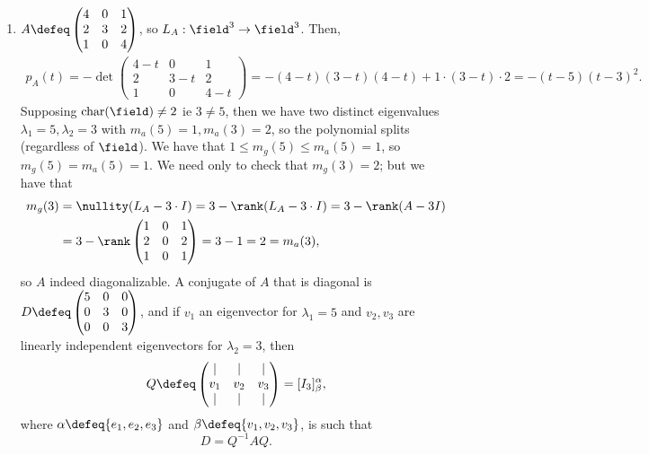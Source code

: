 \begin{example}
    \begin{enumerate}
        \item $A \defeq \begin{pmatrix}
            4 & 0 & 1\\
            2 & 3& 2\\
            1 & 0 & 4   
        \end{pmatrix}$, so $L_A : \field^3 \to \field^3$. Then, \begin{align*}
            p_A(t) = - \det\begin{pmatrix}
                4 - t & 0 & 1\\
                2 & 3 - t & 2\\
                1 & 0 & 4- t
            \end{pmatrix} = -(4-t)(3-t)(4-t) + 1 \cdot (3- t) \cdot 2 = - (t-5)(t-3)^2.
        \end{align*}
        Supposing $\text{char}(\field)\neq 2$ ie $3 \neq 5$, then we have two distinct eigenvalues $\lambda_1 = 5, \lambda_2 = 3$ with $m_a(5) = 1, m_a(3) = 2$, so the polynomial splits (regardless of $\field$). We have that $1 \leq m_g(5) \leq m_a(5) = 1$, so $m_g(5) = m_a(5) = 1$. We need only to check that $m_g(3) = 2$; but we have that \begin{align*}
            m_g(3) &= \nullity(L_A - 3\cdot I) = 3 - \rank(L_A - 3\cdot I) = 3 - \rank(A - 3I)\\
            &= 3 - \rank\begin{pmatrix}
                1 & 0 & 1\\
                2 & 0 & 2\\
                1 & 0 & 1
            \end{pmatrix}  = 3 - 1 = 2 = m_a(3),
        \end{align*}
        so $A$ indeed diagonalizable. A conjugate of $A$ that is diagonal is $D \defeq \begin{pmatrix}
            5 & 0 & 0 \\
            0 & 3 & 0\\
            0 & 0 & 3
        \end{pmatrix}$, and if $v_1$ an eigenvector for $\lambda_1 = 5$ and $v_2, v_3$ are linearly independent eigenvectors for $\lambda_2 = 3$, then \[
        Q \defeq \begin{pmatrix}
            \vert & \vert & \vert \\
            v_1 & v_2 & v_3\\
            \vert & \vert & \vert 
        \end{pmatrix}  = [I_3]_\beta^\alpha,
        \] 
        where $\alpha \defeq \{e_1, e_2, e_3\}$ and $\beta \defeq \{v_1, v_2, v_3\}$, is such that \[
        D = Q^{-1} A Q.
        \]


\end{enumerate}
\end{example}
